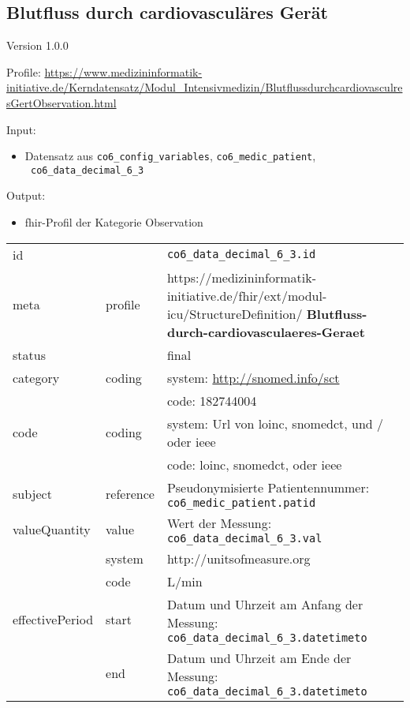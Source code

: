\subsection{Blutfluss durch cardiovasculäres Gerät} 
\noindent Version 1.0.0

\noindent Profile: \url{https://www.medizininformatik-initiative.de/Kerndatensatz/Modul_Intensivmedizin/BlutflussdurchcardiovasculresGertObservation.html}

\noindent Input:
\begin{itemize}
	\item Datensatz aus \texttt{co6\_config\_variables}, \texttt{co6\_medic\_patient}, \\ \texttt{
co6\_data\_decimal\_6\_3}
\end{itemize}
Output:
\begin{itemize}
        \item \ac{fhir}-Profil der Kategorie \glqq Observation\grqq{}
\end{itemize}
\begin{longtable}{|l|l|p{7.5cm}|}
        \hline
        \rowcolor{lightgray} \multicolumn{3}{|l|}{Data Mapping (inhaltlich)} \\ \hline
        id &  & \texttt{co6\_data\_decimal\_6\_3.id} \\ \hline
	meta & profile & https://medizininformatik-initiative.de/fhir/ext/modul-icu/StructureDefinition/\textbf{
Blutfluss-durch-cardiovasculaeres-Geraet} \\ \hline 
	status &  & final  \\ \hline 
	category & coding & system: \url{http://snomed.info/sct} \\
\cline{3-3}
	& & code: 182744004 \\ \hline
	code & coding & system: Url von \ac{loinc}, \ac{snomedct}, und / oder \ac{ieee} \\ 
	\cline{3-3} 
	 &  & code: \ac{loinc}, \ac{snomedct}, oder \ac{ieee} \\ \hline
	subject & reference & Pseudonymisierte Patientennummer: \texttt{co6\_medic\_patient.patid} \\ \hline
	valueQuantity & value & Wert der Messung: \texttt{
co6\_data\_decimal\_6\_3.val} \\
        \cline{2-3}
         & system & http://unitsofmeasure.org \\
         \cline{2-3}
         & code & L/min
\\ \hline
    effectivePeriod & start & Datum und Uhrzeit am Anfang der Messung: \texttt{
co6\_data\_decimal\_6\_3.datetimeto} \\
    \cline{2-3}
     & end & Datum und Uhrzeit am Ende der Messung: \texttt{
co6\_data\_decimal\_6\_3.datetimeto} \\ \hline
\end{longtable}


